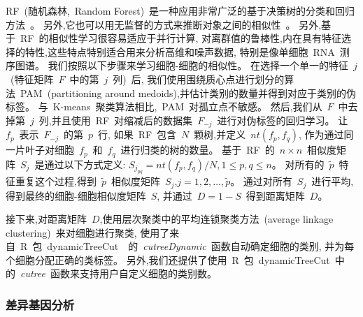 
RF~(随机森林,~Random Forest)~是一种应用非常广泛的基于决策树的分类和回归方法~\cite{breiman2001random}。
另外,它也可以用无监督的方式来推断对象之间的相似性~\cite{shi2006unsupervised,breiman2011manual,pouyan2018random}。
另外,基于~RF~的相似性学习很容易适应于并行计算,
对离群值的鲁棒性,内在具有特征选择的特性,这些特点特别适合用来分析高维和噪声数据,
特别是像单细胞~RNA~测序图谱。
我们按照以下步骤来学习细胞-细胞的相似性。
在选择一个单一的特征~$j$~(特征矩阵~$F$~中的第~$j$~列)~后, 
我们使用围绕质心点进行划分的算法~PAM~(partitioning around medoids),并估计类别的数量并得到对应于类别的伪标签。
与~K-means~聚类算法相比,~PAM~对孤立点不敏感。
然后,我们从~$F$~中去掉第~$j$~列,并且使用~RF~对缩减后的数据集~$F_{-j}$~进行对伪标签的回归学习。
让~$f_p$~表示~$F_{-j}$~的第~$p$~行,
如果~RF~包含~$N$~颗树,并定义~$nt(f_p,f_q)$, 作为通过同一片叶子对细胞~$f_p$~和~$f_q$~进行归类的树的数量。
基于~RF~的~$n \times n$~相似度矩阵~$S_j$~是通过以下方式定义:
$S_{j_{pq}} = nt(f_p,f_q) / N, 1 \le p,q \le n$。
对所有的~$\tilde{p}$~特征重复这个过程,得到~$\tilde{p}$~相似度矩阵~$S_j$,$j=1,2,\ldots,\tilde{p}$。
通过对所有~$S_j$~进行平均,得到最终的细胞-细胞相似度矩阵~$S$,
并通过~$D=1-S$~得到距离矩阵~$D$。

接下来,对距离矩阵~$D$,使用层次聚类中的平均连锁聚类方法~(average linkage clustering)~来对细胞进行聚类,
使用了来自~R~包~dynamicTreeCut~\cite{langfelder2007defining,package-dynamicTreeCut}~的~\textit{cutreeDynamic}~函数自动确定细胞的类别,
并为每个细胞分配正确的类标签。
另外,我们还提供了使用~R~包~dynamicTreeCut~中的~\textit{cutree}~函数来支持用户自定义细胞的类别数。

\subsubsection{差异基因分析}
\label{subsec:de}

